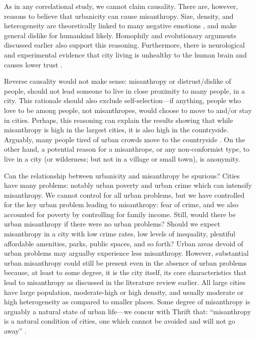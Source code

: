 \documentclass[11pt, letterpaper]{article}
\begin{document}
\begin{spacing}{1.4}
As in any correlational study, we cannot claim causality. There are, however,
reasons to believe that urbanicity can cause misanthropy. Size, density, and
heterogeneity are theoretically linked to many negative emotions
\citep{wirth38}, and make general dislike for humankind likely. Homophily and
evolutionary arguments discussed earlier also support this reasoning. {Furthermore, there is neurological and experimental evidence that city living is unhealthy to the human brain \citep{lederbogen11} and causes lower trust \citep{milgram70}.}

Reverse causality would not make sense: misanthropy or distrust/dislike of people, should
not lead someone to live in close proximity to many people, in a city. This rationale should also exclude self-selection---if anything, people who
 love to be among  people, not misanthropes, would choose to move to and/or stay in cities. Perhaps, this reasoning can explain the results showing that while misanthropy is high in the largest
cities, it is also high in the countryside. Arguably, many people tired of urban crowds move to the countryside \citep[e.g.,][]{deweyWP17nov23}.
%
On the other hand, a potential reason for a misanthrope, or any  non-conformist type, to live in a city (or wilderness; but not in a village or small town), is anonymity.

Can the relationship between urbanicity and misanthropy be spurious? Cities have many problems: notably urban poverty and urban crime which can intensify misanthropy. We cannot control for all urban problems, but we have
controlled for the key urban problem leading to misanthropy: fear of crime, and we also accounted for poverty by controlling for family income. 
Still, would there be urban misanthropy if there were no urban problems? Should
we expect misanthropy in a city with low crime rates, low levels of inequality,
plentiful affordable amenities, parks, public spaces, and so forth? Urban areas
devoid of urban problems may argualby experience less misanthropy. However,
 substantial urban misanthropy could still be present even in the absence of urban problems
because, at least to some degree, it is the city itself, its core
characteristics that lead to misanthropy as discussed in the literature review
earlier. All large cities have large population, moderate-high or high density, and usually moderate or high heterogeneity as compared to smaller
places. Some degree of misanthropy is arguably a natural state of urban life---we concur with Thrift that: ``misanthropy is a natural condition of cities, one which cannot be avoided and will not go away'' \citep{thrift05}.
%


\end{spacing}
\end{document}

